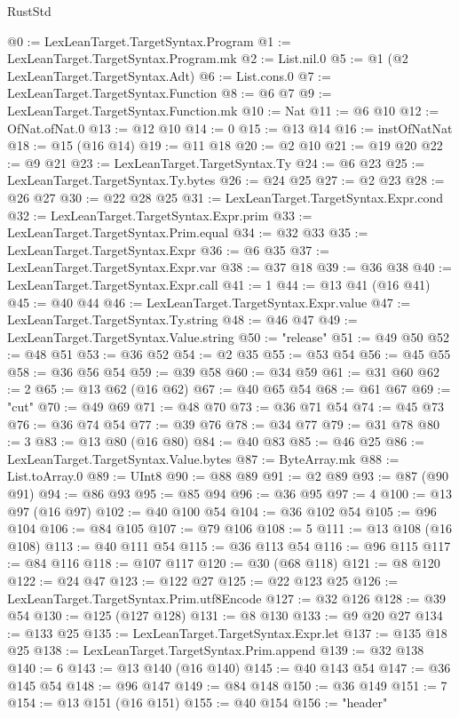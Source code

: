 \begin{lexlean}{RustStd}
\begin{coremodule}
@0 := LexLeanTarget.TargetSyntax.Program
@1 := LexLeanTarget.TargetSyntax.Program.mk
@2 := List.nil.{0}
@5 := @1 (@2 LexLeanTarget.TargetSyntax.Adt)
@6 := List.cons.{0}
@7 := LexLeanTarget.TargetSyntax.Function
@8 := @6 @7
@9 := LexLeanTarget.TargetSyntax.Function.mk
@10 := Nat
@11 := @6 @10
@12 := OfNat.ofNat.{0}
@13 := @12 @10
@14 := 0
@15 := @13 @14
@16 := instOfNatNat
@18 := @15 (@16 @14)
@19 := @11 @18
@20 := @2 @10
@21 := @19 @20
@22 := @9 @21
@23 := LexLeanTarget.TargetSyntax.Ty
@24 := @6 @23
@25 := LexLeanTarget.TargetSyntax.Ty.bytes
@26 := @24 @25
@27 := @2 @23
@28 := @26 @27
@30 := @22 @28 @25
@31 := LexLeanTarget.TargetSyntax.Expr.cond
@32 := LexLeanTarget.TargetSyntax.Expr.prim
@33 := LexLeanTarget.TargetSyntax.Prim.equal
@34 := @32 @33
@35 := LexLeanTarget.TargetSyntax.Expr
@36 := @6 @35
@37 := LexLeanTarget.TargetSyntax.Expr.var
@38 := @37 @18
@39 := @36 @38
@40 := LexLeanTarget.TargetSyntax.Expr.call
@41 := 1
@44 := @13 @41 (@16 @41)
@45 := @40 @44
@46 := LexLeanTarget.TargetSyntax.Expr.value
@47 := LexLeanTarget.TargetSyntax.Ty.string
@48 := @46 @47
@49 := LexLeanTarget.TargetSyntax.Value.string
@50 := "release"
@51 := @49 @50
@52 := @48 @51
@53 := @36 @52
@54 := @2 @35
@55 := @53 @54
@56 := @45 @55
@58 := @36 @56 @54
@59 := @39 @58
@60 := @34 @59
@61 := @31 @60
@62 := 2
@65 := @13 @62 (@16 @62)
@67 := @40 @65 @54
@68 := @61 @67
@69 := "cut"
@70 := @49 @69
@71 := @48 @70
@73 := @36 @71 @54
@74 := @45 @73
@76 := @36 @74 @54
@77 := @39 @76
@78 := @34 @77
@79 := @31 @78
@80 := 3
@83 := @13 @80 (@16 @80)
@84 := @40 @83
@85 := @46 @25
@86 := LexLeanTarget.TargetSyntax.Value.bytes
@87 := ByteArray.mk
@88 := List.toArray.{0}
@89 := UInt8
@90 := @88 @89
@91 := @2 @89
@93 := @87 (@90 @91)
@94 := @86 @93
@95 := @85 @94
@96 := @36 @95
@97 := 4
@100 := @13 @97 (@16 @97)
@102 := @40 @100 @54
@104 := @36 @102 @54
@105 := @96 @104
@106 := @84 @105
@107 := @79 @106
@108 := 5
@111 := @13 @108 (@16 @108)
@113 := @40 @111 @54
@115 := @36 @113 @54
@116 := @96 @115
@117 := @84 @116
@118 := @107 @117
@120 := @30 (@68 @118)
@121 := @8 @120
@122 := @24 @47
@123 := @122 @27
@125 := @22 @123 @25
@126 := LexLeanTarget.TargetSyntax.Prim.utf8Encode
@127 := @32 @126
@128 := @39 @54
@130 := @125 (@127 @128)
@131 := @8 @130
@133 := @9 @20 @27
@134 := @133 @25
@135 := LexLeanTarget.TargetSyntax.Expr.let
@137 := @135 @18 @25
@138 := LexLeanTarget.TargetSyntax.Prim.append
@139 := @32 @138
@140 := 6
@143 := @13 @140 (@16 @140)
@145 := @40 @143 @54
@147 := @36 @145 @54
@148 := @96 @147
@149 := @84 @148
@150 := @36 @149
@151 := 7
@154 := @13 @151 (@16 @151)
@155 := @40 @154
@156 := "header"

\end{coremodule}
\end{lexlean}
